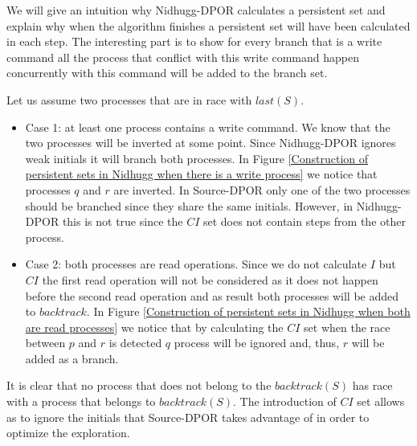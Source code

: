 We will give an intuition why Nidhugg-DPOR calculates a persistent set and explain why when the algorithm finishes a
persistent set will have been calculated in each step. The interesting part is to show for every branch that is a write
command all the process that conflict with this write command happen concurrently with this command will be added to the
branch set.

Let us assume two processes that are in race with $last(S)$.
\begin{itemize}

\item Case 1: at least one process contains a write command. We know that the two processes will be inverted at some
point. Since Nidhugg-DPOR ignores weak initials it will branch both processes. In Figure \ref{Construction of persistent
sets in Nidhugg when there is a write process} we notice that processes $q$ and $r$ are inverted. In Source-DPOR only
one of the two processes should be branched since they share the same initials. However, in Nidhugg-DPOR this is not
true since the $CI$ set does not contain steps from the other process.


\item Case 2: both processes are read operations.
Since we do not calculate $I$ but $CI$ the first read operation will not be considered as it does not happen before the second read operation and as result
both processes will be added to $backtrack$. In Figure \ref{Construction of persistent sets in Nidhugg when both are read processes} we notice that by calculating the $CI$ set when the race
between $p$ and $r$ is detected $q$ process will be ignored and, thus, $r$ will be added as a branch.


\end{itemize}

It is clear that no process that does not belong to the $backtrack(S)$ has race with a process that belongs to $backtrack(S)$. The introduction of $CI$ set allows
as to ignore the initials that Source-DPOR takes advantage of in order to optimize the exploration.
